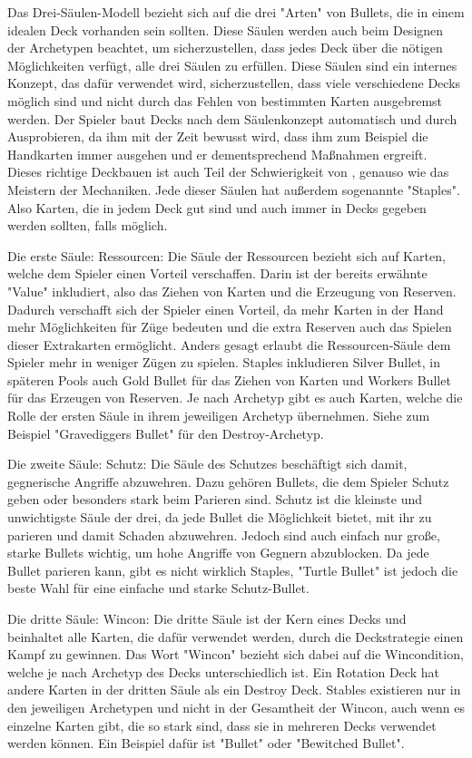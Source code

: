 Das Drei-Säulen-Modell bezieht sich auf die drei "Arten" von Bullets, die in einem idealen Deck vorhanden sein sollten.
Diese Säulen werden auch beim Designen der Archetypen beachtet, um sicherzustellen, dass jedes Deck über die nötigen
Möglichkeiten verfügt, alle drei Säulen zu erfüllen. Diese Säulen sind ein internes Konzept, das dafür verwendet wird,
sicherzustellen, dass viele verschiedene Decks möglich sind und nicht durch das Fehlen von bestimmten Karten ausgebremst
werden. Der Spieler baut Decks nach dem Säulenkonzept automatisch und durch Ausprobieren, da ihm mit der Zeit bewusst wird,
dass ihm zum Beispiel die Handkarten immer ausgehen und er dementsprechend Maßnahmen ergreift. Dieses richtige Deckbauen
ist auch Teil der Schwierigkeit von \FF, genauso wie das Meistern der Mechaniken. Jede dieser Säulen hat außerdem sogenannte "Staples".
Also Karten, die in jedem Deck gut sind und auch immer in Decks gegeben werden sollten, falls möglich.


Die erste Säule: Ressourcen:
Die Säule der Ressourcen bezieht sich auf Karten, welche dem Spieler einen Vorteil verschaffen. Darin ist der bereits
erwähnte "Value" inkludiert, also das Ziehen von Karten und die Erzeugung von Reserven. Dadurch verschafft sich der Spieler einen Vorteil,
da mehr Karten in der Hand mehr Möglichkeiten für Züge bedeuten und die extra Reserven auch das Spielen dieser Extrakarten ermöglicht.
Anders gesagt erlaubt die Ressourcen-Säule dem Spieler mehr in weniger Zügen zu spielen.
Staples inkludieren Silver Bullet, in späteren Pools auch Gold Bullet für das Ziehen von Karten und Workers Bullet für das Erzeugen von Reserven.
Je nach Archetyp gibt es auch Karten, welche die Rolle der ersten Säule in ihrem jeweiligen Archetyp übernehmen.
Siehe zum Beispiel "Gravediggers Bullet" für den Destroy-Archetyp.


Die zweite Säule: Schutz:
Die Säule des Schutzes beschäftigt sich damit, gegnerische Angriffe abzuwehren. Dazu gehören Bullets, die dem Spieler
Schutz geben oder besonders stark beim Parieren sind. Schutz ist die kleinste und unwichtigste Säule der drei,
da jede Bullet die Möglichkeit bietet, mit ihr zu parieren und damit Schaden abzuwehren. Jedoch sind auch einfach nur große,
starke Bullets wichtig, um hohe Angriffe von Gegnern abzublocken. Da jede Bullet parieren kann, gibt es nicht wirklich Staples,
"Turtle Bullet" ist jedoch die beste Wahl für eine einfache und starke Schutz-Bullet.


Die dritte Säule: Wincon:
Die dritte Säule ist der Kern eines Decks und beinhaltet alle Karten, die dafür verwendet werden, durch die Deckstrategie einen Kampf zu gewinnen.
Das Wort "Wincon" bezieht sich dabei auf die Wincondition, welche je nach Archetyp des Decks unterschiedlich ist.
Ein Rotation Deck hat andere Karten in der dritten Säule als ein Destroy Deck. Stables existieren nur in den jeweiligen Archetypen
und nicht in der Gesamtheit der Wincon, auch wenn es einzelne Karten gibt, die so stark sind, dass sie in mehreren Decks verwendet werden können.
Ein Beispiel dafür ist "Bullet" oder "Bewitched Bullet".


